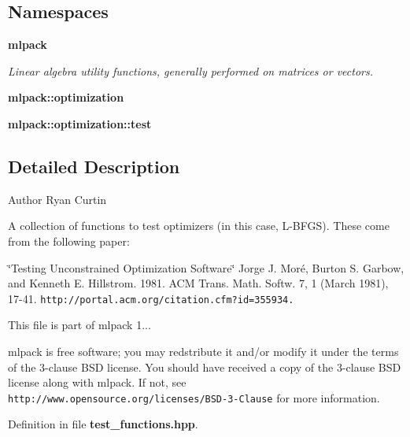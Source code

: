 \subsection*{Namespaces}
\begin{DoxyCompactItemize}
\item 
{\bf mlpack}
\begin{DoxyCompactList}\small\item\em Linear algebra utility functions, generally performed on matrices or vectors. \end{DoxyCompactList}\item 
{\bf mlpack\-::optimization}
\item 
{\bf mlpack\-::optimization\-::test}
\end{DoxyCompactItemize}


\subsection{Detailed Description}
\begin{DoxyAuthor}{Author}
Ryan Curtin
\end{DoxyAuthor}
A collection of functions to test optimizers (in this case, L-\/\-B\-F\-G\-S). These come from the following paper\-:

\char`\"{}\-Testing Unconstrained Optimization Software\char`\"{} Jorge J. Moré, Burton S. Garbow, and Kenneth E. Hillstrom. 1981. A\-C\-M Trans. Math. Softw. 7, 1 (March 1981), 17-\/41. {\tt http\-://portal.\-acm.\-org/citation.\-cfm?id=355934.}

This file is part of mlpack 1...

mlpack is free software; you may redstribute it and/or modify it under the terms of the 3-\/clause B\-S\-D license. You should have received a copy of the 3-\/clause B\-S\-D license along with mlpack. If not, see {\tt http\-://www.\-opensource.\-org/licenses/\-B\-S\-D-\/3-\/\-Clause} for more information. 

Definition in file {\bf test\-\_\-functions.\-hpp}.

